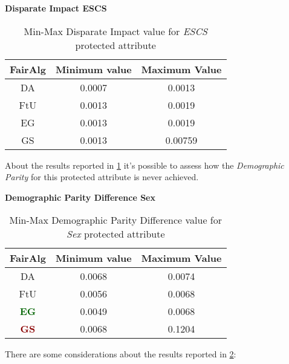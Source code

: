 \textbf{Disparate Impact ESCS}
\begin{table}
    \centering
    \begin{tabular}{|c|c|c|}
        \hline
        \textbf{FairAlg} & \textbf{Minimum value} & \textbf{Maximum Value} \\
        \hline
        DA & 0.0007 & 0.0013 \\
        \hline
        FtU & 0.0013 & 0.0019 \\
        \hline
        EG & 0.0013 & 0.0019 \\
        \hline
        GS & 0.0013 & 0.00759 \\
        \hline
    \end{tabular}
    \caption{Min-Max Disparate Impact value for \emph{ESCS} protected attribute}
    \label{tab:e_di}
\end{table}

About the results reported in \cref{tab:e_di} it's possible to assess how the \emph{Demographic Parity} for this protected attribute is never achieved.


\textbf{Demographic Parity Difference Sex}
\begin{table}[H]
    \centering
    \begin{tabular}{|c|c|c|}
        \hline
        \textbf{FairAlg} & \textbf{Minimum value} & \textbf{Maximum Value} \\
        \hline
        DA & 0.0068 & 0.0074 \\
        \hline
        FtU & 0.0056 & 0.0068 \\
        \hline
        \textcolor{darkgreen}{\textbf{EG}} & 0.0049 & 0.0068 \\
        \hline
        \textcolor{darkred}{\textbf{GS}} & 0.0068 & 0.1204 \\
        \hline
    \end{tabular}
    \caption{Min-Max Demographic Parity Difference value for \emph{Sex} protected attribute}
    \label{tab:s_dpd}
\end{table}

There are some considerations about the results reported in \cref{tab:s_dpd}:

